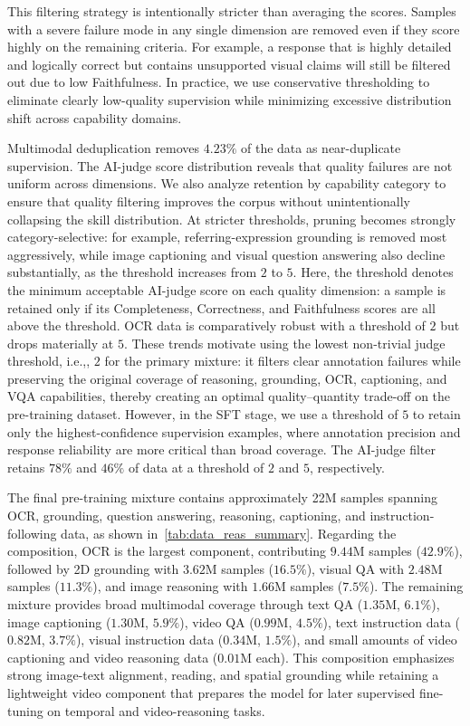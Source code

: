 \documentclass{llmxive}
\providecommand{\ie}{i.e.,\xspace}
\begin{document}
This filtering strategy is intentionally stricter than averaging the scores. Samples with a severe failure mode in any single dimension are removed even if they score highly on the remaining criteria. For example, a response that is highly detailed and logically correct but contains unsupported visual claims will still be filtered out due to low Faithfulness. In practice, we use conservative thresholding to eliminate clearly low-quality supervision while minimizing excessive distribution shift across capability domains.

Multimodal deduplication removes $4.23\%$ of the data as near-duplicate supervision. The AI-judge score distribution reveals that quality failures are not uniform across dimensions. We also analyze retention by capability category to ensure that quality filtering improves the corpus without unintentionally collapsing the skill distribution. At stricter thresholds, pruning becomes strongly category-selective: for example, referring-expression grounding is removed most aggressively, while image captioning and visual question answering also decline substantially, as the threshold increases from $2$ to $5$. Here, the threshold denotes the minimum acceptable AI-judge score on each quality dimension: a sample is retained only if its Completeness, Correctness, and Faithfulness scores are all above the threshold. OCR data is comparatively robust with a threshold of $2$ but drops materially at $5$. These trends motivate using the lowest non-trivial judge threshold, \ie, $2$ for the primary mixture: it filters clear annotation failures while preserving the original coverage of reasoning, grounding, OCR, captioning, and VQA capabilities, thereby creating an optimal quality--quantity trade-off on the pre-training dataset. However, in the SFT stage, we use a threshold of $5$ to retain only the highest-confidence supervision examples, where annotation precision and response reliability are more critical than broad coverage. The AI-judge filter retains $78\%$ and $46\%$ of data at a threshold of $2$ and $5$, respectively.

The final pre-training mixture contains approximately 22M samples spanning OCR, grounding, question answering, reasoning, captioning, and instruction-following data, as shown in~\cref{tab:data_reas_summary}. Regarding the composition, OCR is the largest component, contributing $9.44$M samples ($42.9\%$), followed by 2D grounding with $3.62$M samples ($16.5\%$), visual QA with $2.48$M samples ($11.3\%$), and image reasoning with $1.66$M samples ($7.5\%$). The remaining mixture provides broad multimodal coverage through text QA ($1.35$M, $6.1\%$), image captioning ($1.30$M, $5.9\%$), video QA ($0.99$M, $4.5\%$), text instruction data ($0.82$M, $3.7\%$), visual instruction data ($0.34$M, $1.5\%$), and small amounts of video captioning and video reasoning data ($0.01$M each). This composition emphasizes strong image-text alignment, reading, and spatial grounding while retaining a lightweight video component that prepares the model for later supervised fine-tuning on temporal and video-reasoning tasks.
\end{document}
